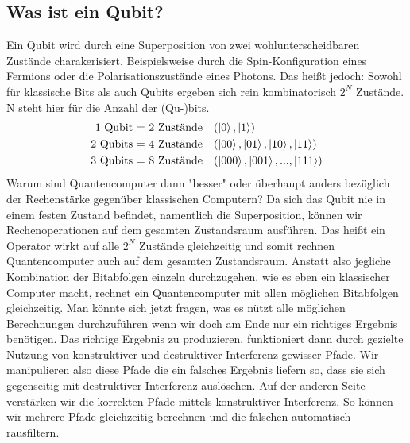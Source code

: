 \documentclass[11pt]{article}
\begin{document}
\subsection{Was ist ein Qubit?}
Ein Qubit wird durch eine Superposition von zwei wohlunterscheidbaren Zustände charakerisiert. Beispielsweise durch die
Spin-Konfiguration eines Fermions oder die Polarisationszustände eines Photons. Das heißt jedoch: Sowohl für klassische Bits 
als auch Qubits ergeben sich rein kombinatorisch $2^N$ Zustände. N steht hier für die Anzahl der (Qu-)bits.
\begin{align*}
    \text{1 Qubit = 2 Zustände}\quad&(\ket{0}, \ket{1})\\
    \text{2 Qubits = 4 Zustände}\quad&(\ket{00}, \ket{01}, \ket{10}, \ket{11})\\
    \text{3 Qubits = 8 Zustände}\quad&(\ket{000}, \ket{001}, ..., \ket{111})\\
\end{align*}
Warum sind Quantencomputer
dann "besser" oder überhaupt anders bezüglich der Rechenstärke gegenüber klassischen Computern? Da sich das Qubit nie in einem
festen Zustand befindet, namentlich die Superposition, können wir Rechenoperationen auf dem gesamten Zustandsraum ausführen. Das 
heißt ein Operator wirkt auf alle $2^N$ Zustände gleichzeitig und somit rechnen Quantencomputer auch auf dem gesamten Zustandsraum.
Anstatt also jegliche Kombination der Bitabfolgen einzeln durchzugehen, wie es eben ein klassischer Computer macht, rechnet ein
Quantencomputer mit allen möglichen Bitabfolgen gleichzeitig. Man könnte sich jetzt fragen, was es nützt alle möglichen Berechnungen
durchzuführen wenn wir doch am Ende nur ein richtiges Ergebnis benötigen. Das richtige Ergebnis zu produzieren, funktioniert
dann durch gezielte Nutzung von konstruktiver und destruktiver Interferenz gewisser Pfade. Wir manipulieren also diese Pfade die ein
falsches Ergebnis liefern so, dass sie sich gegenseitig mit destruktiver Interferenz auslöschen. Auf der anderen Seite verstärken
wir die korrekten Pfade mittels konstruktiver Interferenz. So können wir mehrere Pfade gleichzeitig berechnen und die falschen
automatisch rausfiltern. 
\end{document}
